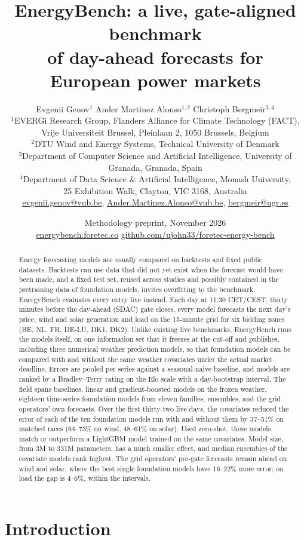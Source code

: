 \documentclass[11pt,a4paper]{article}
\title{\textbf{EnergyBench: a live, gate-aligned benchmark\\of day-ahead forecasts for European power markets}}
\author{Evgenii Genov$^{1}$ \qquad Ander Martinez Alonso$^{1,2}$ \qquad Christoph Bergmeir$^{3,4}$\\[4pt]
\small $^{1}$EVERGi Research Group, Flanders Alliance for Climate Technology (FACT),\\
\small Vrije Universiteit Brussel, Pleinlaan 2, 1050 Brussels, Belgium\\
\small $^{2}$DTU Wind and Energy Systems, Technical University of Denmark\\
\small $^{3}$Department of Computer Science and Artificial Intelligence, University of Granada, Granada, Spain\\
\small $^{4}$Department of Data Science \& Artificial Intelligence, Monash University,\\
\small 25 Exhibition Walk, Clayton, VIC 3168, Australia\\[4pt]
\small\href{mailto:evgenii.genov@vub.be}{evgenii.genov@vub.be}, \href{mailto:Ander.Martinez.Alonso@vub.be}{Ander.Martinez.Alonso@vub.be},
\href{mailto:bergmeir@ugr.es}{bergmeir@ugr.es}}
\date{\small Methodology preprint, November 2026\\
\href{https://energybench.foretec.co}{energybench.foretec.co} \quad\textperiodcentered\quad
\href{https://github.com/ujohn33/foretec-energy-bench}{github.com/ujohn33/foretec-energy-bench}}
\begin{document}
\maketitle

\begin{abstract}
\noindent
Energy forecasting models are usually compared on backtests and fixed public datasets. Backtests can use data that
did not yet exist when the forecast would have been made, and a fixed test set, reused across studies and possibly
contained in the pretraining data of foundation models, invites overfitting to the benchmark. EnergyBench evaluates
every entry live instead. Each day at 11:30 CET/CEST, thirty minutes before the day-ahead (SDAC) gate closes,
every model forecasts the next day's price, wind and solar generation and load on the 15-minute grid for six bidding
zones (BE, NL, FR, DE-LU, DK1, DK2). Unlike existing live benchmarks, EnergyBench runs the models itself, on one
information set that it freezes at the cut-off and publishes, including three numerical weather prediction models, so that
foundation models can be compared with and without the same weather covariates under the actual market deadline. Errors are
pooled per series against a seasonal-naive baseline, and models are ranked by a Bradley--Terry rating on the Elo scale
with a day-bootstrap interval. The field spans baselines, linear and gradient-boosted models on the frozen weather,
eighteen time-series foundation models from eleven families, ensembles, and the grid operators' own forecasts. Over the
first thirty-two live days, the covariates reduced the error of each of the ten foundation models run with and without
them by 37--51\% on matched races (64--73\% on wind, 48--61\% on solar). Used zero-shot, these models match or outperform a LightGBM model trained on the same covariates. Model size,
from 3M to 331M parameters, has a much smaller effect, and median ensembles of the covariate models rank highest. The grid
operators' pre-gate forecasts remain ahead on wind and solar, where the best single foundation models have 16--22\% more error; on load the gap is 4--6\%, within the intervals.
\end{abstract}

\section{Introduction}
\end{document}
